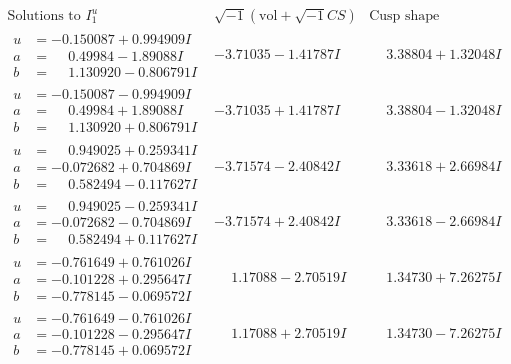 \documentclass[1p]{elsarticle_modified}
\theoremstyle{definition}
\newcommand{\I}{\sqrt{-1}}
\begin{document}
$$\begin{array}{c|c|c}  
\text{Solutions to }I^u_{1}& \I (\text{vol} + \sqrt{-1}CS) & \text{Cusp shape}\\
 \hline 
\begin{aligned}
u &= -0.150087 + 0.994909 I \\
a &= \phantom{-}0.49984 - 1.89088 I \\
b &= \phantom{-}1.130920 - 0.806791 I\end{aligned}
 & -3.71035 - 1.41787 I & \phantom{-}3.38804 + 1.32048 I \\ \hline\begin{aligned}
u &= -0.150087 - 0.994909 I \\
a &= \phantom{-}0.49984 + 1.89088 I \\
b &= \phantom{-}1.130920 + 0.806791 I\end{aligned}
 & -3.71035 + 1.41787 I & \phantom{-}3.38804 - 1.32048 I \\ \hline\begin{aligned}
u &= \phantom{-}0.949025 + 0.259341 I \\
a &= -0.072682 + 0.704869 I \\
b &= \phantom{-}0.582494 - 0.117627 I\end{aligned}
 & -3.71574 - 2.40842 I & \phantom{-}3.33618 + 2.66984 I \\ \hline\begin{aligned}
u &= \phantom{-}0.949025 - 0.259341 I \\
a &= -0.072682 - 0.704869 I \\
b &= \phantom{-}0.582494 + 0.117627 I\end{aligned}
 & -3.71574 + 2.40842 I & \phantom{-}3.33618 - 2.66984 I \\ \hline\begin{aligned}
u &= -0.761649 + 0.761026 I \\
a &= -0.101228 + 0.295647 I \\
b &= -0.778145 - 0.069572 I\end{aligned}
 & \phantom{-}1.17088 - 2.70519 I & \phantom{-}1.34730 + 7.26275 I \\ \hline\begin{aligned}
u &= -0.761649 - 0.761026 I \\
a &= -0.101228 - 0.295647 I \\
b &= -0.778145 + 0.069572 I\end{aligned}
 & \phantom{-}1.17088 + 2.70519 I & \phantom{-}1.34730 - 7.26275 I \\ \hline\begin{aligned}

\end{aligned}
\end{array}$$
\end{document}
